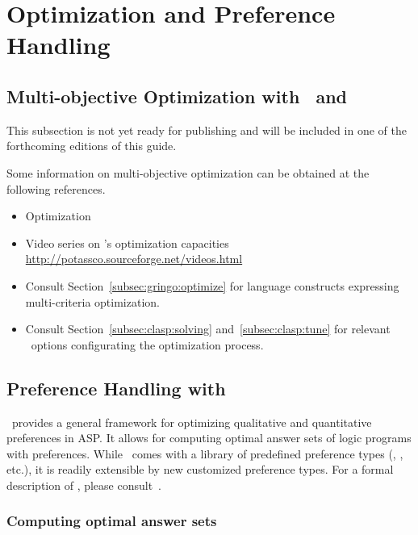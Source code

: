 
\section{Optimization and Preference Handling}
\label{sec:prefopt}

\subsection{Multi-objective Optimization with \clasp\ and \clingo}
\label{sec:oprimization}

This subsection is not yet ready for publishing
and will be included in one of the forthcoming editions of this guide.

Some information on multi-objective optimization
can be obtained at the following references.

\begin{itemize}
\item Optimization \cite{gekakasc11b,gekakasc11c,gekasc11b,ankamasc12a}
\item Video series on \clasp's optimization capacities \url{http://potassco.sourceforge.net/videos.html}
\item Consult Section~\ref{subsec:gringo:optimize} for language constructs expressing multi-criteria optimization.
\item Consult Section~\ref{subsec:clasp:solving} and~\ref{subsec:clasp:tune} for relevant \clasp\ options configurating the optimization process.
\end{itemize}

\subsection{Preference Handling with \asprin}\label{sec:asprin}
%
%
\asprin\ provides a general framework for optimizing qualitative and quantitative preferences in ASP.
It allows for computing optimal answer sets of logic programs with preferences.
While \asprin\ comes with a library of predefined preference types 
(, , etc.),
it is readily extensible by new customized preference types.
For a formal description of \asprin, please consult~\cite{brderosc15a}. 

\subsubsection{Computing optimal answer sets}

